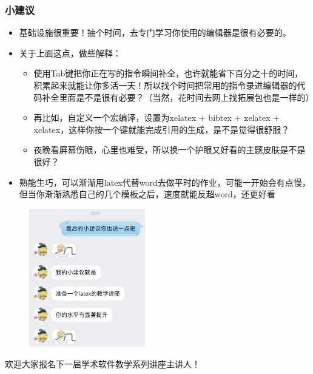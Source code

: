     \begin{frame}[fragile]
        \frametitle{小建议}
        \begin{itemize}
            \item 基础设施很重要！抽个时间，去专门学习你使用的编辑器是很有必要的。
            \item 关于上面这点，做些解释：
            \begin{itemize}
                \item 使用Tab键把你正在写的指令瞬间补全，也许就能省下百分之十的时间，积累起来就能让你多活一天！所以找个时间把常用的指令录进编辑器的代码补全里面是不是很有必要？（当然，花时间去网上找拓展包也是一样的）
                \item 再比如，自定义一个宏编译，设置为xelatex + bibtex + xelatex + xelatex，这样你按一个键就能完成引用的生成，是不是觉得很舒服？
                \item 夜晚看屏幕伤眼，心里也难受，所以换一个护眼又好看的主题皮肤是不是很好？
            \end{itemize}\pause
            \item 熟能生巧，可以渐渐用latex代替word去做平时的作业，可能一开始会有点慢，但当你渐渐熟悉自己的几个模板之后，速度就能反超word，还更好看
        \end{itemize}
    \end{frame}
    
    \begin{frame}[fragile]
        \begin{figure}
        \includegraphics[width=0.45\textwidth]{img//tip.png}
        \end{figure}
        \begin{center}
        欢迎大家报名下一届学术软件教学系列讲座主讲人！
        \end{center}
    \end{frame}
    
